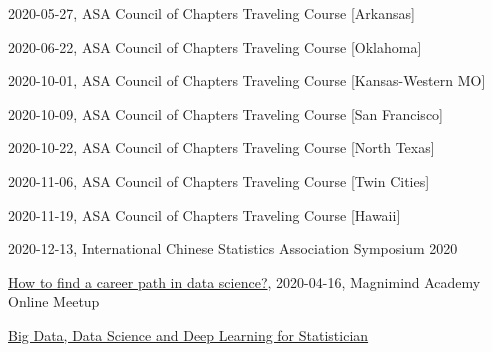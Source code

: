 \documentclass[11pt,]{article}
\providecommand{\tightlist}{%
  \setlength{\itemsep}{0pt}\setlength{\parskip}{0pt}}
\renewenvironment{itemize}{
  \begin{list}{}{
    \setlength{\leftmargin}{1.5em}
  }
}{
  \end{list}
}
\begin{document}
\begin{itemize}
  \begin{itemize}
  \tightlist
  \item
    2020-05-27, ASA Council of Chapters Traveling Course {[}Arkansas{]}
  \item
    2020-06-22, ASA Council of Chapters Traveling Course {[}Oklahoma{]}
  \item
    2020-10-01, ASA Council of Chapters Traveling Course
    {[}Kansas-Western MO{]}
  \item
    2020-10-09, ASA Council of Chapters Traveling Course {[}San
    Francisco{]}
  \item
    2020-10-22, ASA Council of Chapters Traveling Course {[}North
    Texas{]}
  \item
    2020-11-06, ASA Council of Chapters Traveling Course {[}Twin
    Cities{]}
  \item
    2020-11-19, ASA Council of Chapters Traveling Course {[}Hawaii{]}
  \item
    2020-12-13, International Chinese Statistics Association Symposium
    2020
  \end{itemize}
\item
  \href{https://www.meetup.com/Introduction-to-Data-Science/events/269785708/}{How
  to find a career path in data science?}, 2020-04-16, Magnimind Academy
  Online Meetup
\item
  \href{https://course2019.netlify.com/}{Big Data, Data Science and Deep
  Learning for Statistician}


\end{itemize}
\end{document}
